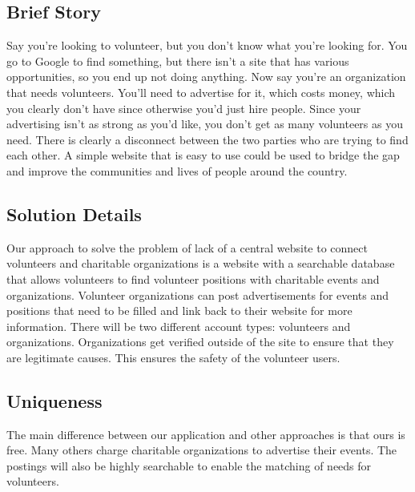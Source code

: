 \documentclass[12pt]{article}
\begin{document}
\subsection{Brief Story}
Say you’re looking to volunteer, but you don’t know what you’re looking for. You go to Google to find something, but there isn’t a site that has various opportunities, so you end up not doing anything. Now say you’re an organization that needs volunteers. You’ll need to advertise for it, which costs money, which you clearly don’t have since otherwise you’d just hire people. Since your advertising isn’t as strong as you’d like, you don’t get as many volunteers as you need.  There is clearly a disconnect between the two parties who are trying to find each other.  A simple website that is easy to use could be used to bridge the gap and improve the communities and lives of people around the country.\\

\subsection{Solution Details}
Our approach to solve the problem of lack of a central website to connect volunteers and charitable organizations is a website with a searchable database that allows volunteers to find volunteer positions with charitable events and organizations.  Volunteer organizations can post advertisements for events and positions that need to be filled and link back to their website for more information.  There will be two different account types: volunteers and organizations.  Organizations get verified outside of the site to ensure that they are legitimate causes.  This ensures the safety of the volunteer users.\\

\subsection{Uniqueness}
The main difference between our application and other approaches is that ours is free. Many others charge charitable organizations to advertise their events.  The postings will also be highly searchable to enable the matching of needs for volunteers.
\end{document}
